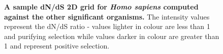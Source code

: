 \documentclass{article}
\begin{document}
\begin{figure}[H]
\centering
{}
\caption{\textbf{A sample dN/dS 2D grid for \textit{Homo sapiens} computed against the other significant organisms.} The intensity values represent the dN/dS ratio - values lighter in colour are less than 1 and purifying selection while values darker in colour are greater than 1 and represent positive selection.}
\label{fig_4}
\end{figure}
\end{document}
